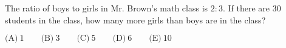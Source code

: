 

The ratio of boys to girls in Mr. Brown's math class is $2:3$. If there are $30$ students in the class, how many more girls than boys are in the class?

$\text{(A)}\ 1 \qquad \text{(B)}\ 3 \qquad \text{(C)}\ 5 \qquad \text{(D)}\ 6 \qquad \text{(E)}\ 10$
